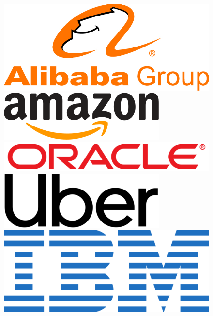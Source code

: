 \documentclass[xcolor=dvipsnames]{beamer}
\begin{document}
\begin{frame}
\begin{figure}
\begin{center}
	\hspace{0.15cm}\includegraphics[scale=0.15]{alibaba.jpg}	
	\hspace{0.15cm}\includegraphics[scale=0.25]{amazon.png} \\[0.3cm]
	\hspace{0.15cm}\includegraphics[scale=0.20]{oracle.png}
	\hspace{0.15cm}\includegraphics[scale=0.55]{uber.png}
	\hspace{0.15cm}\includegraphics[scale=0.15]{ibm.png}\\[0.3cm]

\end{center}
\end{figure}
\end{frame}
\end{document}
